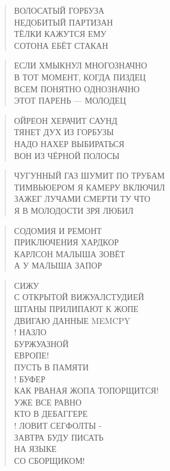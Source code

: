 \poemtitle{***}
\begin{verse}
ВОЛОСАТЫЙ ГОРБУЗА\\
НЕДОБИТЫЙ ПАРТИЗАН\\
ТЁЛКИ КАЖУТСЯ ЕМУ\\
СОТОНА ЕБЁТ СТАКАН
\end{verse}

\poemtitle{***}
\begin{verse}
ЕСЛИ ХМЫКНУЛ МНОГОЗНАЧНО\\
В ТОТ МОМЕНТ, КОГДА ПИЗДЕЦ\\
ВСЕМ ПОНЯТНО ОДНОЗНАЧНО\\
ЭТОТ ПАРЕНЬ — МОЛОДЕЦ
\end{verse}

\poemtitle{***}
\begin{verse}
ОЙРЕОН ХЕРАЧИТ САУНД\\
ТЯНЕТ ДУХ ИЗ ГОРБУЗЫ\\
НАДО НАХЕР ВЫБИРАТЬСЯ\\
ВОН ИЗ ЧЁРНОЙ ПОЛОСЫ
\end{verse}

\poemtitle{***}
\begin{verse}
ЧУГУННЫЙ ГАЗ ШУМИТ ПО ТРУБАМ\\
ТИМВЬЮЕРОМ Я КАМЕРУ ВКЛЮЧИЛ\\
ЗАЖЕГ ЛУЧАМИ СМЕРТИ ТУ ЧТО\\
Я В МОЛОДОСТИ ЗРЯ ЛЮБИЛ
\end{verse}

\poemtitle{***}
\begin{verse}
СОДОМИЯ И РЕМОНТ\\
ПРИКЛЮЧЕНИЯ ХАРДКОР\\
КАРЛСОН МАЛЫША ЗОВЁТ\\
А У МАЛЫША ЗАПОР
\end{verse}

\poemtitle{***}
\begin{verse}
СИЖУ\\
С ОТКРЫТОЙ ВИЖУАЛСТУДИЕЙ\\
ШТАНЫ ПРИЛИПАЮТ К ЖОПЕ\\
ДВИГАЮ ДАННЫЕ MEMCPY\\!
НАЗЛО\\
БУРЖУАЗНОЙ\\
ЕВРОПЕ!\\
ПУСТЬ В ПАМЯТИ\\!
БУФЕР\\
КАК РВАНАЯ ЖОПА ТОПОРЩИТСЯ!\\
УЖЕ ВСЕ РАВНО\\
КТО В ДЕБАГГЕРЕ\\!
ЛОВИТ СЕГФОЛТЫ -\\
ЗАВТРА БУДУ ПИСАТЬ \\
НА ЯЗЫКЕ\\
СО СБОРЩИКОМ!
\end{verse}

